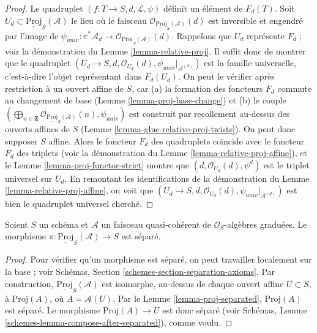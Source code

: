 \begin{proof}
Le quadruplet $(f : T \to S, d, \mathcal{L}, \psi)$ définit un élément de
$F_d(T)$. Soit $U_d \subset \underline{\text{Proj}}_S(\mathcal{A})$ le lieu
où le faisceau $\mathcal{O}_{\underline{\text{Proj}}_S(\mathcal{A})}(d)$ est
inversible et engendré par l'image de
$\psi_{univ} : \pi^*\mathcal{A}_d \to
\mathcal{O}_{\underline{\text{Proj}}_S(\mathcal{A})}(d)$.
Rappelons que $U_d$ représente $F_d$ ; voir la démonstration du
Lemme \ref{lemma-relative-proj}. Il suffit donc de montrer que le quadruplet
$(U_d \to S, d, \mathcal{O}_{U_d}(d), \psi_{univ}|_{\mathcal{A}^{(d)}})$
est la famille universelle, c'est-à-dire l'objet représentant dans
$F_d(U_d)$. On peut le vérifier après restriction à un ouvert affine de
$S$, car (a) la formation des foncteurs $F_d$ commute au changement de base
(Lemme \ref{lemma-proj-base-change}) et (b) le couple
$(\bigoplus_{n \in \mathbf{Z}}
\mathcal{O}_{\underline{\text{Proj}}_S(\mathcal{A})}(n),
\psi_{univ})$
est construit par recollement au-dessus des ouverts affines de $S$
(Lemme \ref{lemma-glue-relative-proj-twists}).
On peut donc supposer $S$ affine. Alors le foncteur $F_d$ des quadruplets
coïncide avec le foncteur $F_d$ des triplets (voir la démonstration du
Lemme \ref{lemma-relative-proj-affine}), et le
Lemme \ref{lemma-proj-functor-strict} montre que
$(d, \mathcal{O}_{U_d}(d), \psi^d)$ est le triplet universel sur $U_d$.
En remontant les identifications de la démonstration du
Lemme \ref{lemma-relative-proj-affine}, on voit que
$(U_d \to S, d, \mathcal{O}_{U_d}(d), \psi_{univ}|_{\mathcal{A}^{(d)}})$
est bien le quadruplet universel cherché.
\end{proof}

\begin{lemma}
\label{lemma-relative-proj-separated}
Soient $S$ un schéma et $\mathcal{A}$ un faisceau quasi-cohérent de
$\mathcal{O}_S$-algèbres graduées. Le morphisme
$\pi : \underline{\text{Proj}}_S(\mathcal{A}) \to S$ est séparé.
\end{lemma}

\begin{proof}
Pour vérifier qu'un morphisme est séparé, on peut travailler localement sur
la base ; voir Schémas, Section \ref{schemes-section-separation-axioms}.
Par construction, $\underline{\text{Proj}}_S(\mathcal{A})$ est isomorphe,
au-dessus de chaque ouvert affine $U \subset S$, à $\text{Proj}(A)$, où
$A = \mathcal{A}(U)$. Par le Lemme \ref{lemma-proj-separated},
$\text{Proj}(A)$ est séparé. Le morphisme $\text{Proj}(A) \to U$ est donc
séparé (voir Schémas, Lemme \ref{schemes-lemma-compose-after-separated}),
comme voulu.
\end{proof}

